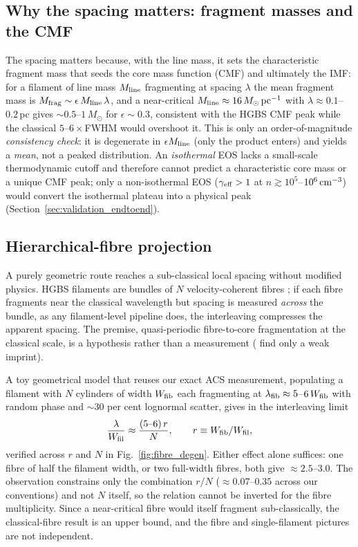 \documentclass[usenatbib,twoside,twocolumn]{mnras}
\begin{document}
\subsection{Why the spacing matters: fragment masses and the CMF}
\label{sec:cmf}
The spacing matters because, with the line mass, it sets the characteristic fragment mass that seeds the core mass function (CMF) and ultimately the IMF: for a filament of line mass $M_{\rm line}$ fragmenting at spacing $\lambda$ the mean fragment mass is $M_{\rm frag}\sim\epsilon\,M_{\rm line}\,\lambda$, and a near-critical $M_{\rm line}\approx16\,M_\odot\,{\rm pc^{-1}}$ with $\lambda\approx0.1$--$0.2$\,pc gives $\sim0.5$--$1\,M_\odot$ for $\epsilon\sim0.3$, consistent with the HGBS CMF peak while the classical $5$--$6\times$FWHM would overshoot it. This is only an order-of-magnitude \emph{consistency check}: it is degenerate in $\epsilon M_{\rm line}$ (only the product enters) and yields a \emph{mean}, not a peaked distribution. An \emph{isothermal} EOS lacks a small-scale thermodynamic cutoff and therefore cannot predict a characteristic core mass or a unique CMF peak; only a non-isothermal EOS ($\gamma_{\rm eff}>1$ at $n\gtrsim10^{5}$--$10^{6}\,{\rm cm^{-3}}$) would convert the isothermal plateau into a physical peak (Section~\ref{sec:validation_endtoend}).

\subsection{Hierarchical-fibre projection}
\label{sec:fibre_projection}

A purely geometric route reaches a sub-classical local spacing without modified physics. HGBS filaments are bundles of $N$ velocity-coherent fibres \citep{Hacar2013,Hacar2018,Yang2024}; if each fibre fragments near the classical wavelength but spacing is measured \emph{across} the bundle, as any filament-level pipeline does, the interleaving compresses the apparent spacing. The premise, quasi-periodic fibre-to-core fragmentation at the classical scale, is a hypothesis rather than a measurement (\citealt{Yang2024} find only a weak imprint).

A toy geometrical model that reuses our exact ACS measurement, populating a filament with $N$ cylinders of width $W_{\rm fib}$ each fragmenting at $\lambda_{\rm fib}\approx5$--$6\,W_{\rm fib}$ with random phase and $\sim30$ per cent lognormal scatter, gives in the interleaving limit
\begin{equation}
\frac{\lambda}{W_{\rm fil}}\approx\frac{(5\text{--}6)\,r}{N},\qquad r\equiv W_{\rm fib}/W_{\rm fil},
\label{eq:fourrn}
\end{equation}
verified across $r$ and $N$ in Fig.~\ref{fig:fibre_degen}. Either effect alone suffices: one fibre of half the filament width, or two full-width fibres, both give $\approx2.5$--$3.0$. The observation constrains only the combination $r/N$ ($\approx0.07$--$0.35$ across our conventions) and not $N$ itself, so the relation cannot be inverted for the fibre multiplicity. Since a near-critical fibre would itself fragment sub-classically, the classical-fibre result is an upper bound, and the fibre and single-filament pictures are not independent.
\end{document}
